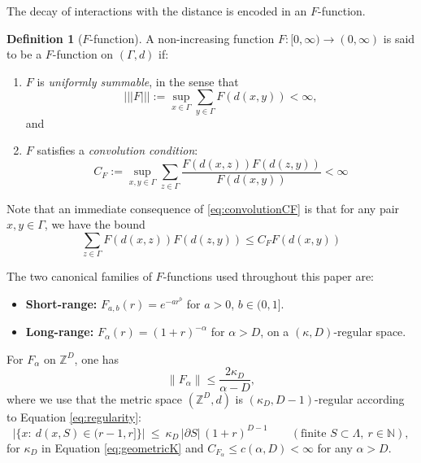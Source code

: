 \documentclass[11pt]{article}
\numberwithin{equation}{section}
\numberwithin{figure}{section}
\numberwithin{table}{section}
\theoremstyle{definition}
\newtheorem{mydef}{Definition}[section]
\theoremstyle{plain}
\theoremstyle{remark}
\newcommand{\Z}{\mathbb{Z}}
\newcommand{\G}{\Gamma}
\begin{document}
The decay of interactions with the distance is encoded in an $F$-function.
\medskip
\begin{mydef}[$F$-function]\label{def:Ffunction}
    A non-increasing function $F:[0,\infty)\to (0,\infty )$ is said to be a $F$-function on $(\Gamma,d)$ if:
\begin{enumerate}
    \item $F$ is \textit{uniformly summable}, in the sense that
    \begin{equation}
        \lvert\lvert\lvert F\rvert \rvert \rvert:=\sup_{x\in\Gamma}\sum_{y\in \Gamma}F(d(x,y))<\infty,
        \label{eq:normF}
    \end{equation}
    and
    \item $F$ satisfies a \textit{convolution condition}:
    \begin{equation}
        C_F:=\sup_{x,y\in \G}\sum_{z\in\G}\dfrac{F(d(x,z))F(d(z,y))}{F(d(x,y))}<\infty
        \label{eq:convolutionCF}
    \end{equation}
\end{enumerate}
\end{mydef}
Note that an immediate consequence of \eqref{eq:convolutionCF} is that for any pair $x,y\in\G$, we have the bound
\begin{equation}
   \sum_{z\in\G} F(d(x,z))F(d(z,y))\leq C_FF(d(x,y))
\end{equation}

The two canonical families of $F$-functions used throughout 
this paper are:
\begin{itemize}
    \item \textbf{Short-range:} $F_{a,b}(r) = e^{-ar^b}$ for $a > 0$, 
    $b \in (0,1]$.
    \item \textbf{Long-range:} $F_\alpha(r) = (1+r)^{-\alpha}$ for 
    $\alpha > D$, on a $(\kappa,D)$-regular space.
\end{itemize}
For $F_\alpha$ on $\mathbb{Z}^D$, one has\[\|F_\alpha\| \leq \frac{2\kappa_D}{\alpha - D},\] where we use that the metric space $(\Z^D,d)$ is $(\kappa_D,D-1)$-regular according to Equation \eqref{eq:regularity}:
\begin{equation}\label{eq:SR}
\left|\{x:\ d(x,S)\in(r-1,r]\}\right|\ \le\ \kappa_D \,|\partial S|\,(1+r)^{D-1}\qquad (\text{finite }S\subset\Lambda,~r\in\mathbb N),
\end{equation}
 for $\kappa_D$ in Equation \eqref{eq:geometricK} and 
$C_{F_\alpha} \leq c(\alpha, D) < \infty$ for any $\alpha > D$.

\medskip
\end{document}
